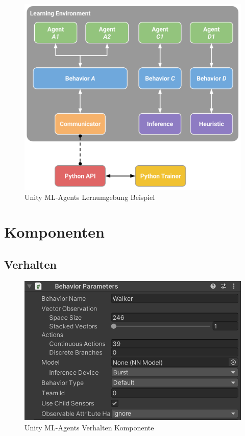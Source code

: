 \begin{figure}[H]
  \centering  
  \includegraphics[scale=0.3]{img/learning_environment_example.png}
  \caption{Unity ML-Agents Lernumgebung Beispiel \protect\cite{unity_mlagents_learning_environment_example}}
  \label{fig:learning_environment_example}
\end{figure}

\section{Komponenten}

\subsection{Verhalten}
\begin{figure}[H]
  \centering  
  \includegraphics[scale=0.5]{img/verhalten_komponente.png}
  \caption{Unity ML-Agents Verhalten Komponente}
  \label{fig:verhalten_komponente}
\end{figure}

